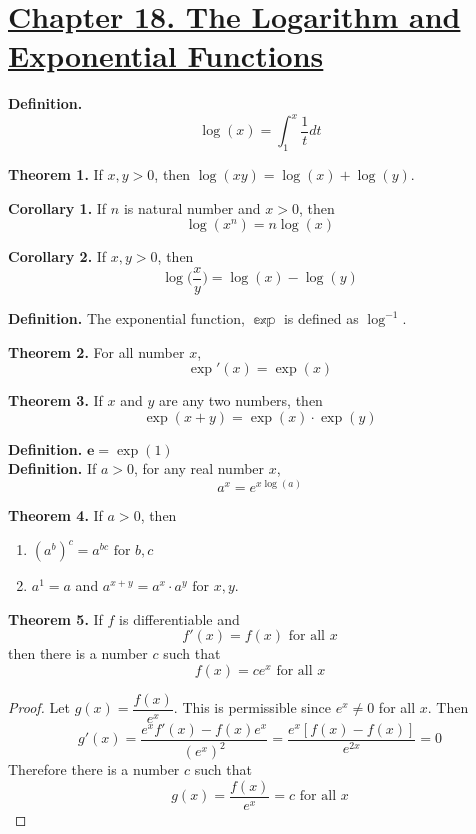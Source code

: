\documentclass[10pt,letterpaper]{article}
\begin{document}
	\section*{{\color{red}\underline{Chapter 18. The Logarithm and Exponential Functions}}} 
	\textbf{Definition. } 
	$$\log(x) = \int_1^x \dfrac{1}{t} dt$$
	
	\textbf{Theorem 1. }
	If $x, y > 0$, then $\log(xy) = \log(x) + \log(y)$.
	
	\textbf{Corollary 1.} If $n$ is natural number and $x > 0$, then
	$$\log(x^n) = n \log(x)$$
	
	\textbf{Corollary 2. } If $x, y > 0$, then 
	$$\log\bigg(\dfrac{x}{y}\bigg) = \log(x) - \log(y)$$
	
	\textbf{Definition. } 
	The exponential function, $\mathbb{\exp}$ is defined as $\log^{-1}$.
	
	\textbf{Theorem 2. } 
	For all number $x$,
	$$\exp'(x) = \exp(x)$$
	
	\textbf{Theorem 3. } 
	If $x$ and $y$ are any two numbers, then 
	$$\exp(x + y) = \exp(x) \cdot \exp(y)$$
	
	\textbf{Definition. }
	$\mathbf{e} = \exp(1)$ \\
	
	\textbf{Definition. } 
	If $a > 0$, for any real number $x$,
	$$a^x = e^{x\log(a)}$$
	
	\textbf{Theorem 4. } 
	If $a > 0$, then 
	\begin{enumerate}[(1)]
		\item $(a^b)^c = a^{bc} \text{ for } b, c$
		\item $a^1 = a$ and $a^{x+y} = a^x \cdot a^y \text{ for } x, y$.
	\end{enumerate}
	
	\textbf{Theorem 5. }
	If $f$ is differentiable and 
	$$f'(x) = f(x) \text{ for all } x$$
	then there is a number $c$ such that
	$$f(x) = ce^x \text{ for all } x$$
\begin{proof}
	Let $g(x) = \dfrac{f(x)}{e^x}$. This is permissible since $e^x \neq 0$ for all $x$. Then
	$$g'(x) = \dfrac{e^xf'(x) - f(x)e^x}{(e^x)^2} = 
	\dfrac{e^x[f(x) - f(x)]}{e^{2x}} = 	
	0$$
	Therefore there is a number $c$ such that
	$$g(x) = \dfrac{f(x)}{e^x} = c \text{ for all } x$$
\end{proof}
\end{document}
